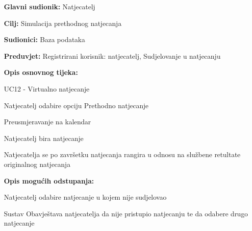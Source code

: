 					
					\noindent {}
					\begin{packed_item}
						
						\item \textbf{Glavni sudionik: } Natjecatelj
						\item  \textbf{Cilj:} Simulacija prethodnog natjecanja
						\item  \textbf{Sudionici:} Baza podataka
						\item  \textbf{Preduvjet:}  Registrirani korisnik: natjecatelj, Sudjelovanje u natjecanju
						\item  \textbf{Opis osnovnog tijeka:}
						
						\item[] \begin{packed_enum}
							\item UC12 - Virtualno natjecanje
							\item Natjecatelj odabire opciju Prethodno natjecanje
							\item Preusmjeravanje na kalendar 
							\item Natjecatelj bira natjecanje
							\item Natjecatelja se po završetku natjecanja rangira u odnosu na službene retultate originalnog natjecanja
									
						\end{packed_enum}
						\item  \textbf{Opis mogućih odstupanja:  } 
						\item[] \begin{packed_enum}
							
							\item[4.a] Natjecatelj odabire natjecanje u kojem nije sudjelovao
							
							\item[] \begin{packed_enum}
								
								\item Sustav Obavještava natjecatelja da nije pristupio natjecanju te da odabere drugo natjecanje
								
							\end{packed_enum}
							
						\end{packed_enum}
					\end{packed_item}
					
